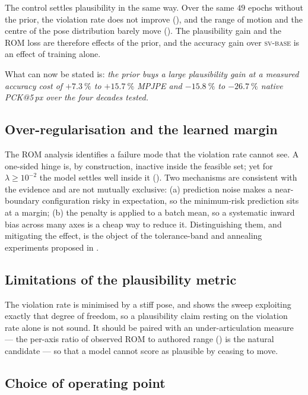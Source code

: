 \documentclass[11pt,a4paper]{article}
\newcommand{\lam}{\lambda}
\newcommand{\armbase}{\textsc{sv-base}}
\begin{document}
The control settles plausibility in the same way. Over the same $49$ epochs
without the prior, the violation rate does not improve
(), and the range of motion and the centre of the pose
distribution barely move (). The
plausibility gain and the ROM loss are therefore effects of the prior, and the
accuracy gain over \armbase{} is an effect of training alone.

What can now be stated is: \emph{the prior buys a large plausibility gain at a
measured accuracy cost of $+\SI{7.3}{\percent}$ to $+\SI{15.7}{\percent}$
MPJPE and $-\SI{15.8}{\percent}$ to $-\SI{26.7}{\percent}$ native PCK@5\,px
over the four decades tested.}

\subsection{Over-regularisation and the learned margin}

The ROM analysis identifies a failure mode that the violation rate cannot see.
A one-sided hinge is, by construction, inactive inside the feasible set; yet
for $\lam \ge 10^{-2}$ the model settles well inside it ().
Two mechanisms are consistent with the evidence and are not mutually exclusive:
(a) prediction noise makes a near-boundary configuration risky in expectation,
so the minimum-risk prediction sits at a margin; (b) the penalty is applied to
a batch mean, so a systematic inward bias across many axes is a cheap way to
reduce it. Distinguishing them, and mitigating the effect, is the object of the
tolerance-band and annealing experiments proposed in .

\subsection{Limitations of the plausibility metric}

The violation rate is minimised by a stiff pose, and  shows
the sweep exploiting exactly that degree of freedom, so a plausibility claim
resting on the violation rate alone is not sound. It should be paired with an
under-articulation measure --- the per-axis ratio of observed ROM to authored
range () is the natural candidate --- so that a model cannot
score as plausible by ceasing to move.

\subsection{Choice of operating point}
\end{document}
